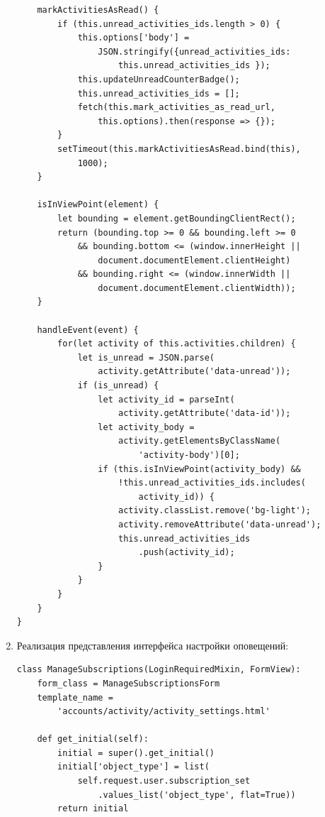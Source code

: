 \documentclass[14pt, a4paper, oneside]{extarticle}
\begin{document}
\begin{enumerate}[wide, labelindent=0pt]
{\begin{verbatim}
    markActivitiesAsRead() {
        if (this.unread_activities_ids.length > 0) {
            this.options['body'] = 
                JSON.stringify({unread_activities_ids: 
                    this.unread_activities_ids });
            this.updateUnreadCounterBadge();
            this.unread_activities_ids = [];
            fetch(this.mark_activities_as_read_url, 
                this.options).then(response => {});
        }
        setTimeout(this.markActivitiesAsRead.bind(this), 
            1000);
    }

    isInViewPoint(element) {
        let bounding = element.getBoundingClientRect();
        return (bounding.top >= 0 && bounding.left >= 0 
            && bounding.bottom <= (window.innerHeight || 
                document.documentElement.clientHeight)
            && bounding.right <= (window.innerWidth || 
                document.documentElement.clientWidth));
    }

    handleEvent(event) {
        for(let activity of this.activities.children) {
            let is_unread = JSON.parse(
                activity.getAttribute('data-unread'));
            if (is_unread) {
                let activity_id = parseInt(
                    activity.getAttribute('data-id'));
                let activity_body = 
                    activity.getElementsByClassName(
                        'activity-body')[0];
                if (this.isInViewPoint(activity_body) && 
                    !this.unread_activities_ids.includes(
                        activity_id)) {
                    activity.classList.remove('bg-light');
                    activity.removeAttribute('data-unread');
                    this.unread_activities_ids
                        .push(activity_id);
                }
            }
        }
    }
}            
        \end{verbatim}
    }
    \item {
        Реализация представления интерфейса настройки оповещений: \label{code:activity-settings-view}
        \begin{verbatim}
class ManageSubscriptions(LoginRequiredMixin, FormView):
    form_class = ManageSubscriptionsForm
    template_name = 
        'accounts/activity/activity_settings.html'

    def get_initial(self):
        initial = super().get_initial()
        initial['object_type'] = list(
            self.request.user.subscription_set
                .values_list('object_type', flat=True))
        return initial


\end{verbatim}}
\end{enumerate}
\end{document}
